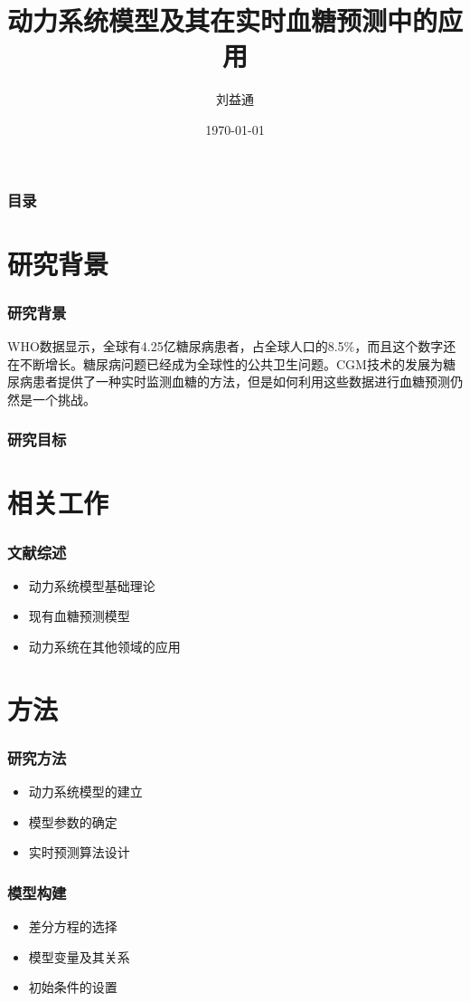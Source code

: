 \documentclass{beamer}
\title{动力系统模型及其在实时血糖预测中的应用}
\author{刘益通}
\institute{上海科技大学}
\date{\today}
\begin{document}
\begin{frame}
  \titlepage
\end{frame}

\begin{frame}
  \frametitle{目录}
  \tableofcontents
\end{frame}

\section{研究背景}
\begin{frame}
  \frametitle{研究背景}
    WHO数据显示，全球有4.25亿糖尿病患者，占全球人口的8.5\%，而且这个数字还在不断增长。糖尿病问题已经成为全球性的公共卫生问题。CGM技术的发展为糖尿病患者提供了一种实时监测血糖的方法，但是如何利用这些数据进行血糖预测仍然是一个挑战。
\end{frame}

\begin{frame}
  \frametitle{研究目标}
  
\end{frame}

\section{相关工作}
\begin{frame}
  \frametitle{文献综述}
  \begin{itemize}
    \item 动力系统模型基础理论
    \item 现有血糖预测模型
    \item 动力系统在其他领域的应用
  \end{itemize}
\end{frame}

\section{方法}
\begin{frame}
  \frametitle{研究方法}
  \begin{itemize}
    \item 动力系统模型的建立
    \item 模型参数的确定
    \item 实时预测算法设计
  \end{itemize}
\end{frame}

\begin{frame}
  \frametitle{模型构建}
  \begin{itemize}
    \item 差分方程的选择
    \item 模型变量及其关系
    \item 初始条件的设置
  \end{itemize}
\end{frame}
\end{document}
